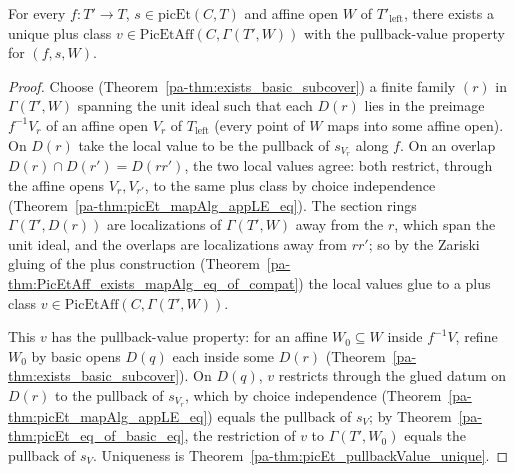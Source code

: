 \begin{theorem}
  \label{pa-thm:picEt_exists_isPullbackValue}
  \leanok

  For every \(f \colon T' \to T\), \(s \in \mathrm{picEt}(C, T)\) and affine open \(W\) of
  \(T'_{\mathrm{left}}\), there exists a unique plus class \(v \in \mathrm{PicEtAff}(C, \Gamma(T',
  W))\) with the pullback-value property for \((f, s, W)\).
\end{theorem}
\begin{proof}
  \leanok
  Choose (Theorem~\ref{pa-thm:exists_basic_subcover}) a finite family \((r)\) in \(\Gamma(T', W)\)
  spanning the unit ideal such that each \(D(r)\) lies in the preimage \(f^{-1}V_r\) of an affine
  open \(V_r\) of \(T_{\mathrm{left}}\) (every point of \(W\) maps into some affine open). On
  \(D(r)\) take the local value to be the pullback of \(s_{V_r}\) along \(f\). On an overlap
  \(D(r) \cap D(r') = D(r r')\), the two local values agree: both restrict, through the affine
  opens \(V_r, V_{r'}\), to the same plus class by choice independence
  (Theorem~\ref{pa-thm:picEt_mapAlg_appLE_eq}). The section rings \(\Gamma(T', D(r))\) are localizations
  of \(\Gamma(T', W)\) away from the \(r\), which span the unit ideal, and the overlaps are
  localizations away from \(r r'\); so by the Zariski gluing of the plus construction
  (Theorem~\ref{pa-thm:PicEtAff_exists_mapAlg_eq_of_compat}) the local values glue to a plus class
  \(v \in \mathrm{PicEtAff}(C, \Gamma(T', W))\).

  This \(v\) has the pullback-value property: for an affine \(W_0 \subseteq W\) inside \(f^{-1}V\),
  refine \(W_0\) by basic opens \(D(q)\) each inside some \(D(r)\)
  (Theorem~\ref{pa-thm:exists_basic_subcover}). On \(D(q)\), \(v\) restricts through the glued datum on
  \(D(r)\) to the pullback of \(s_{V_r}\), which by choice independence
  (Theorem~\ref{pa-thm:picEt_mapAlg_appLE_eq}) equals the pullback of \(s_V\); by
  Theorem~\ref{pa-thm:picEt_eq_of_basic_eq}, the restriction of \(v\) to \(\Gamma(T', W_0)\) equals the
  pullback of \(s_V\). Uniqueness is Theorem~\ref{pa-thm:picEt_pullbackValue_unique}.
\end{proof}

